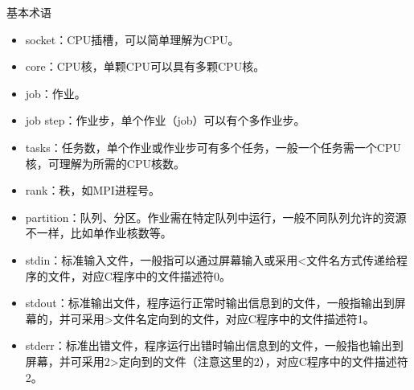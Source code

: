\begin{frame}{基本术语}
\begin{itemize}
	\item socket：CPU插槽，可以简单理解为CPU。
	\item core：CPU核，单颗CPU可以具有多颗CPU核。
	\item job：作业。
	\item job step：作业步，单个作业（job）可以有个多作业步。
	\item tasks：任务数，单个作业或作业步可有多个任务，一般一个任务需一个CPU核，可理解为所需的CPU核数。
	\item rank：秩，如MPI进程号。
	\item partition：队列、分区。作业需在特定队列中运行，一般不同队列允许的资源不一样，比如单作业核数等。
	\item stdin：标准输入文件，一般指可以通过屏幕输入或采用<文件名方式传递给程序的文件，对应C程序中的文件描述符0。
	\item stdout：标准输出文件，程序运行正常时输出信息到的文件，一般指输出到屏幕的，并可采用>文件名定向到的文件，对应C程序中的文件描述符1。
	\item stderr：标准出错文件，程序运行出错时输出信息到的文件，一般指也输出到屏幕，并可采用2>定向到的文件（注意这里的2），对应C程序中的文件描述符2。
\end{itemize}
\end{frame}

